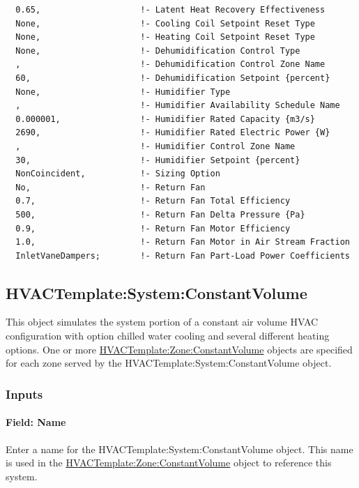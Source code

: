 \begin{lstlisting}
  0.65,                    !- Latent Heat Recovery Effectiveness
  None,                    !- Cooling Coil Setpoint Reset Type
  None,                    !- Heating Coil Setpoint Reset Type
  None,                    !- Dehumidification Control Type
  ,                        !- Dehumidification Control Zone Name
  60,                      !- Dehumidification Setpoint {percent}
  None,                    !- Humidifier Type
  ,                        !- Humidifier Availability Schedule Name
  0.000001,                !- Humidifier Rated Capacity {m3/s}
  2690,                    !- Humidifier Rated Electric Power {W}
  ,                        !- Humidifier Control Zone Name
  30,                      !- Humidifier Setpoint {percent}
  NonCoincident,           !- Sizing Option
  No,                      !- Return Fan
  0.7,                     !- Return Fan Total Efficiency
  500,                     !- Return Fan Delta Pressure {Pa}
  0.9,                     !- Return Fan Motor Efficiency
  1.0,                     !- Return Fan Motor in Air Stream Fraction
  InletVaneDampers;        !- Return Fan Part-Load Power Coefficients
\end{lstlisting}

\subsection{HVACTemplate:System:ConstantVolume}\label{hvactemplatesystemconstantvolume}

This object simulates the system portion of a constant air volume HVAC configuration with option chilled water cooling and several different heating options. One or more \hyperref[hvactemplatezoneconstantvolume]{HVACTemplate:Zone:ConstantVolume} objects are specified for each zone served by the HVACTemplate:System:ConstantVolume object.

\subsubsection{Inputs}\label{inputs-20-002}

\paragraph{Field: Name}\label{field-name-7-007}

Enter a name for the HVACTemplate:System:ConstantVolume object. This name is used in the \hyperref[hvactemplatezoneconstantvolume]{HVACTemplate:Zone:ConstantVolume} object to reference this system.

